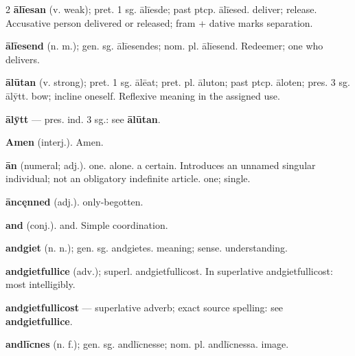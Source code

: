 \begin{multicols*}{2}
\textbf{ālīesan} (v. weak); pret. 1 sg. ālīesde; past ptcp. ālīesed. deliver; release. Accusative person delivered or released; fram + dative marks separation.\par
\textbf{ālīesend} (n. m.); gen. sg. ālīesendes; nom. pl. ālīesend. Redeemer; one who delivers.\par
\textbf{ālūtan} (v. strong); pret. 1 sg. ālēat; pret. pl. āluton; past ptcp. āloten; pres. 3 sg. ālȳtt. bow; incline oneself. Reflexive meaning in the assigned use.\par
\textbf{ālȳtt} — pres. ind. 3 sg.: see \textbf{ālūtan}.\par
\textbf{Amen} (interj.). Amen.\par
\textbf{ān} (numeral; adj.). one. alone. a certain. Introduces an unnamed singular individual; not an obligatory indefinite article. one; single.\par
\textbf{āncęnned} (adj.). only-begotten.\par
\textbf{and} (conj.). and. Simple coordination.\par
\textbf{andgiet} (n. n.); gen. sg. andgietes. meaning; sense. understanding.\par
\textbf{andgietfullice} (adv.); superl. andgietfullicost. In superlative andgietfullicost: most intelligibly.\par
\textbf{andgietfullicost} — superlative adverb; exact source spelling: see \textbf{andgietfullice}.\par
\textbf{andlīcnes} (n. f.); gen. sg. andlīcnesse; nom. pl. andlīcnessa. image.\par

\end{multicols*}
